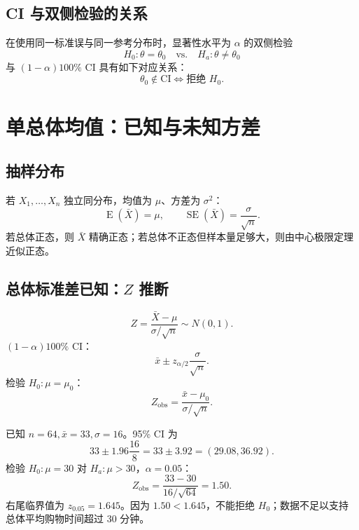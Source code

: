 \documentclass[11pt,a4paper]{article}
\newcommand{\E}{\operatorname{E}}
\newcommand{\SE}{\operatorname{SE}}
\newcommand{\1}{\mathbf{1}}
\begin{document}
\subsection{CI 与双侧检验的关系}

在使用同一标准误与同一参考分布时，显著性水平为 $\alpha$ 的双侧检验
\[
  H_0:\theta=\theta_0
  \quad\text{vs.}\quad
  H_a:\theta\ne\theta_0
\]
与 $(1-\alpha)100\%$ CI 具有如下对应关系：
\[
  \boxed{
  \theta_0\notin \text{CI}
  \Longleftrightarrow
  \text{拒绝 }H_0.
  }
\]

\section{单总体均值：已知与未知方差}

\subsection{抽样分布}

若 $X_1,\ldots,X_n$ 独立同分布，均值为 $\mu$、方差为 $\sigma^2$：
\[
  \E(\bar X)=\mu,\qquad
  \SE(\bar X)=\frac{\sigma}{\sqrt n}.
\]
若总体正态，则 $\bar X$ 精确正态；若总体不正态但样本量足够大，则由中心极限定理近似正态。

\subsection{\texorpdfstring{总体标准差已知：$Z$ 推断}{总体标准差已知：Z 推断}}

\begin{memorybox}
\[
  Z=\frac{\bar X-\mu}{\sigma/\sqrt n}\sim N(0,1).
\]
$(1-\alpha)100\%$ CI：
\[
  \boxed{\bar x\pm z_{\alpha/2}\frac{\sigma}{\sqrt n}.}
\]
检验 $H_0:\mu=\mu_0$：
\[
  \boxed{Z_{\mathrm{obs}}=\frac{\bar x-\mu_0}{\sigma/\sqrt n}.}
\]
\end{memorybox}

\begin{examplebox}
已知 $n=64,\bar x=33,\sigma=16$。95\% CI 为
\[
  33\pm1.96\frac{16}{8}
  =
  33\pm3.92
  =
  (29.08,36.92).
\]
检验 $H_0:\mu=30$ 对 $H_a:\mu>30$，$\alpha=0.05$：
\[
  Z_{\mathrm{obs}}=\frac{33-30}{16/\sqrt{64}}=1.50.
\]
右尾临界值为 $z_{0.05}=1.645$。因为 $1.50<1.645$，不能拒绝 $H_0$；数据不足以支持总体平均购物时间超过 30 分钟。
\end{examplebox}
\end{document}
